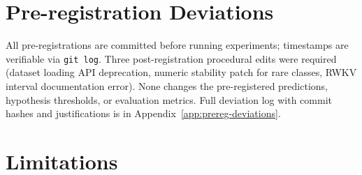\documentclass{article}
\begin{document}
\section{Pre-registration Deviations}
\label{sec:prereg-deviations}
All pre-registrations are committed before running experiments; timestamps are verifiable via \texttt{git log}. Three post-registration procedural edits were required (dataset loading API deprecation, numeric stability patch for rare classes, RWKV interval documentation error). None changes the pre-registered predictions, hypothesis thresholds, or evaluation metrics. Full deviation log with commit hashes and justifications is in Appendix~\ref{app:prereg-deviations}.

\section{Limitations}
\label{sec:limitations}
\end{document}
